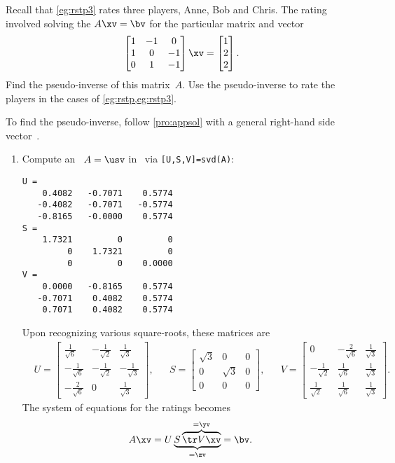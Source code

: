 \begin{example}  
Recall that \cref{eg:rstp3} rates three  players, Anne, Bob and Chris.  
The rating involved solving the  \(A\xv=\bv\) for the particular matrix and vector
\begin{equation*}
\begin{bmatrix} 1&-1&0\\1&0&-1\\0&1&-1 \end{bmatrix}\xv
=\begin{bmatrix} 1\\2\\2 \end{bmatrix}.
\end{equation*}
Find the pseudo-inverse of this matrix~\(A\).
Use the pseudo-inverse to rate the players in the cases of \cref{eg:rstp,eg:rstp3}.
\begin{solution} 
To find the pseudo-inverse, follow \cref{pro:appsol} with a general right-hand side vector~\bv.
\begin{enumerate}
\item Compute an \svd\ \(A=\usv\) in \script\ via \verb|[U,S,V]=svd(A)|:
\begin{verbatim}
U =
    0.4082   -0.7071    0.5774
   -0.4082   -0.7071   -0.5774
   -0.8165   -0.0000    0.5774
S =
    1.7321         0         0
         0    1.7321         0
         0         0    0.0000
V =
    0.0000   -0.8165    0.5774
   -0.7071    0.4082    0.5774
    0.7071    0.4082    0.5774
\end{verbatim}
Upon recognizing various square-roots, these matrices are
\begin{align*}&
U=\begin{bmatrix} \frac1{\sqrt6}&-\frac1{\sqrt2}&\frac1{\sqrt3}
\\-\frac1{\sqrt6}&-\frac1{\sqrt2}&-\frac1{\sqrt3}
\\-\frac2{\sqrt6}&0&\frac1{\sqrt3} \end{bmatrix},
&&
S=\begin{bmatrix} \sqrt3&0&0
\\0&\sqrt3&0
\\0&0&0 \end{bmatrix},
&&
V=\begin{bmatrix} 0&-\frac2{\sqrt6}&\frac1{\sqrt3}
\\-\frac1{\sqrt2}&\frac1{\sqrt6}&\frac1{\sqrt3}
\\\frac1{\sqrt2}&\frac1{\sqrt6}&\frac1{\sqrt3} \end{bmatrix}.
\end{align*}
The system of equations for the ratings becomes
\begin{equation*}
A\xv=
U\underbrace{S\overbrace{\tr V\xv}^{=\yv}}_{=\zv}
=\bv.
\end{equation*}


\end{enumerate}
\end{solution}
\end{example}
